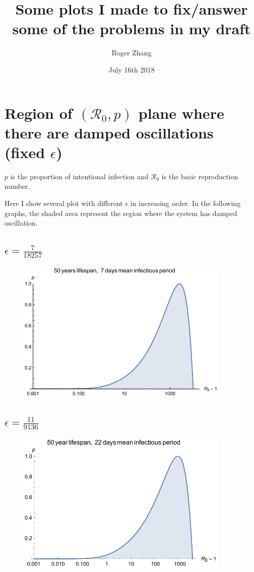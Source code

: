\documentclass[12pt]{article}
\title{Some plots I made to fix/answer some of the problems in my draft}
\author{Roger Zhang}
\date{July 16th 2018}
\newcommand{\R}{\mathcal{R}}
\begin{document}
\maketitle
\clearpage
\section{Region of $(\R_0,p)$ plane where there are damped
  oscillations (fixed $\epsilon$)}

$p$ is the proportion of intentional infection and $\R_0$ is the basic reproduction number.

Here I show several plot with different $\epsilon$ in increasing order. In the following graphs, the shaded area represent the region where the system has damped oscillation.
\subsection{$\epsilon=\frac{7}{18257}$}
\begin{figure}[H]
  \caption{}
  \centering
  \includegraphics[width=0.9\textwidth]{Figures/50_7.pdf}
\end{figure}

\subsection{$\epsilon=\frac{11}{9136}$}
\begin{figure}[H]
  \caption{}
  \centering
  \includegraphics[width=0.9\textwidth]{Figures/50_22.pdf}
\end{figure}
\end{document}
